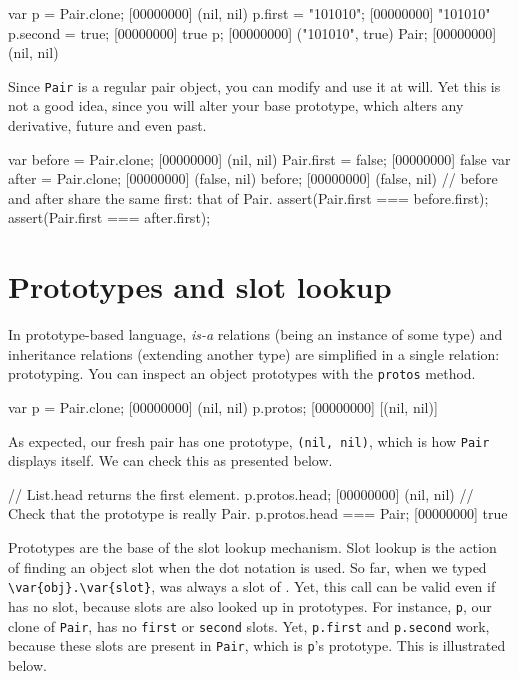 \begin{urbiscript}
var p = Pair.clone;
[00000000] (nil, nil)
p.first = "101010";
[00000000] "101010"
p.second = true;
[00000000] true
p;
[00000000] ("101010", true)
Pair;
[00000000] (nil, nil)
\end{urbiscript}

Since \lstinline|Pair| is a regular pair object, you can modify and
use it at will. Yet this is not a good idea, since you will alter your
base prototype, which alters any derivative, future and even past.

\begin{urbiscript}
var before = Pair.clone;
[00000000] (nil, nil)
Pair.first = false;
[00000000] false
var after = Pair.clone;
[00000000] (false, nil)
before;
[00000000] (false, nil)
// before and after share the same first: that of Pair.
assert(Pair.first === before.first);
assert(Pair.first === after.first);
\end{urbiscript}

\section{Prototypes and slot lookup}

In prototype-based language, \emph{is-a} relations (being an instance
of some type) and inheritance relations (extending another type) are
simplified in a single relation: prototyping. You can inspect an
object prototypes with the \lstinline{protos} method.

\begin{urbiscript}[firstnumber=1]
var p = Pair.clone;
[00000000] (nil, nil)
p.protos;
[00000000] [(nil, nil)]
\end{urbiscript}

As expected, our fresh pair has one prototype, \lstinline|(nil, nil)|,
which is how \lstinline|Pair| displays itself. We can check this as
presented below.

\begin{urbiscript}
// List.head returns the first element.
p.protos.head;
[00000000] (nil, nil)
// Check that the prototype is really Pair.
p.protos.head === Pair;
[00000000] true
\end{urbiscript}

Prototypes are the base of the slot lookup mechanism. Slot lookup is
the action of finding an object slot when the dot notation is used.
So far, when we typed
\lstinline|\var{obj}.\var{slot}|,  was always a slot of
.  Yet, this call can be valid even if  has no
 slot, because slots are also looked up in prototypes. For
instance, \lstinline|p|, our clone of \lstinline|Pair|, has no
\lstinline|first| or \lstinline|second| slots. Yet,
\lstinline|p.first| and \lstinline|p.second| work, because these slots
are present in \lstinline|Pair|, which is \lstinline|p|'s
prototype. This is illustrated below.

